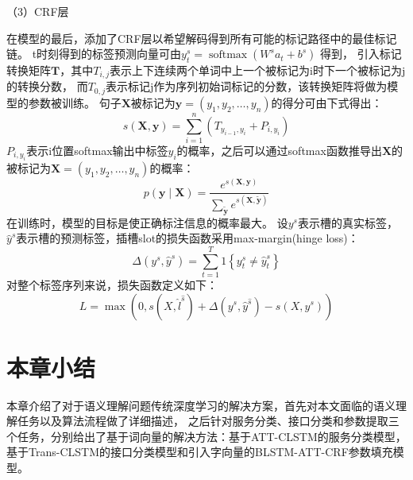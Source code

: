 （3）CRF层

在模型的最后，添加了CRF层以希望解码得到所有可能的标记路径中的最佳标记链。 
t时刻得到的标签预测向量可由$y_{t}^{s}=\operatorname{softmax}\left(W^{s} {a}_{t}+b^{s}\right)$
得到，
引入标记转换矩阵$\mathbf{T}$，其中$T_{i,j}$表示上下连续两个单词中上一个被标记为i时下一个被标记为j的转换分数，
而$T_{0,j}$表示标记j作为序列初始词标记的分数，该转换矩阵将做为模型的参数被训练。 
句子$\mathbf{X}$被标记为$\mathbf{y}=(y_1,y_2,\dots,y_n)$的得分可由下式得出：
\begin{equation}
  s(\mathbf{X}, \mathbf{y})=\sum_{i=1}^{n}\left(T_{y_{i-1}, y_{i}}+P_{i, y_{i}}\right)
\end{equation}
$P_{i, y_{i}}$表示i位置softmax输出中标签$y_{i}$的概率，之后可以通过softmax函数推导出$\mathbf{X}$的被标记为$\mathbf{X}=(y_1,y_2,\dots,y_n)$的概率：
\begin{equation}
  p(\mathbf{y} \mid \mathbf{X})=\frac{e^{s(\mathbf{X}, \mathbf{y})}}{\sum_{\tilde{\mathbf{y}}} e^{s(\mathbf{X}, \tilde{\mathbf{y}})}}
\end{equation}
在训练时，模型的目标是使正确标注信息的概率最大。
设$y^{s}$表示槽的真实标签，$\hat y^{s}$表示槽的预测标签，插槽slot的损失函数采用max-margin(hinge loss)：
\begin{equation}
\Delta\left(y^{s}, \hat{y}^{s}\right)=\sum_{t=1}^{T} 1\left\{y_{t}^{s} \neq \hat{y}_{t}^{s}\right\}
\end{equation}
对整个标签序列来说，损失函数定义如下：
\begin{equation}
L=\max (0, s(X,\hat{l}^{\hat{s}})+\Delta(y^{s}, \hat{y}^{\hat{s}})-s(X,y^{s}))
\end{equation}






\section{本章小结}
本章介绍了对于语义理解问题传统深度学习的解决方案，首先对本文面临的语义理解任务以及算法流程做了详细描述，
之后针对服务分类、接口分类和参数提取三个任务，分别给出了基于词向量的解决方法：基于ATT-CLSTM的服务分类模型，
基于Trans-CLSTM的接口分类模型和引入字向量的BLSTM-ATT-CRF参数填充模型。